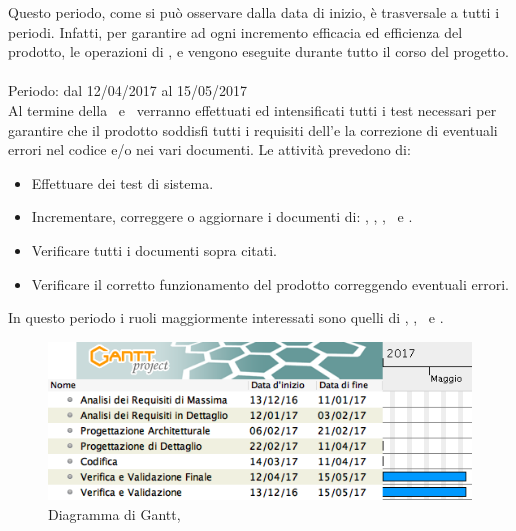 Questo periodo, come si può osservare dalla data di inizio, è trasversale a tutti i periodi. Infatti, per garantire ad ogni incremento efficacia ed efficienza del prodotto, le operazioni di ,  e  vengono eseguite durante tutto il corso del progetto.\\

\paragraph{\VV}
Periodo: dal 12/04/2017 al 15/05/2017 \\

Al termine della \PD\ e \COD\ verranno effettuati ed intensificati tutti i test necessari per garantire che il prodotto soddisfi tutti i requisiti dell'\AdR e la correzione di eventuali errori nel codice e/o nei vari documenti.
Le attività prevedono di:
\begin{itemize}
	\item Effettuare dei test di sistema.
	\item Incrementare, correggere o aggiornare i documenti di: \MU, \NdP, \PdP, \PdQ\ e \Gl.
	\item Verificare tutti i documenti sopra citati.
	\item Verificare il corretto funzionamento del prodotto correggendo eventuali errori.
\end{itemize}
In questo periodo i ruoli maggiormente interessati sono quelli di \Ver, \Prog, \Am\ e \Pm.

 \begin{figure}[H]
	\centering 
	\includegraphics[scale=0.5]{Immagini/Gantt/VV.png}
	\caption{Diagramma di Gantt, \VV}
\end{figure}